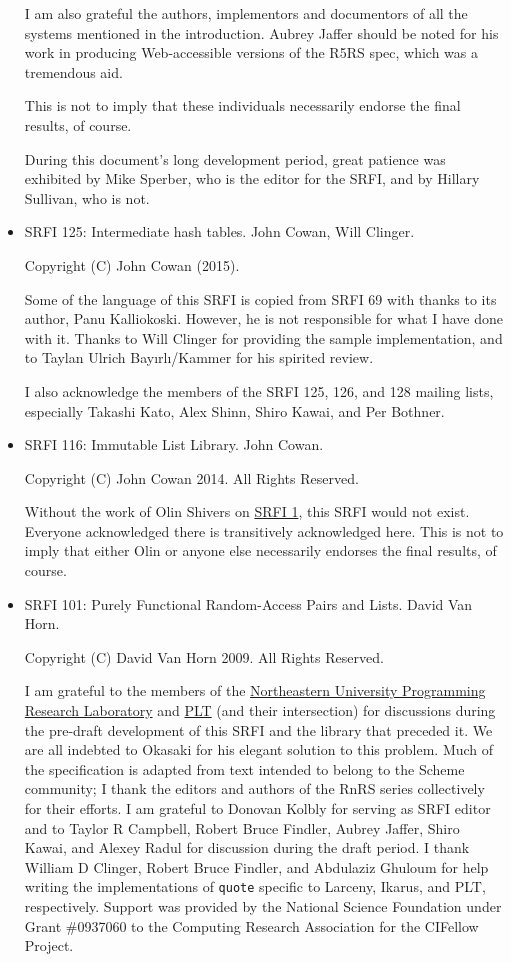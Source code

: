 \begin{itemize}
I am also grateful the authors, implementors and documentors of all the
systems mentioned in the introduction. Aubrey Jaffer should be noted for
his work in producing Web-accessible versions of the R5RS spec, which
was a tremendous aid.

This is not to imply that these individuals necessarily endorse the
final results, of course.

During this document's long development period, great patience was
exhibited by Mike Sperber, who is the editor for the SRFI, and by
Hillary Sullivan, who is not.

\item SRFI 125: Intermediate hash tables. John Cowan, Will Clinger.

Copyright (C) John Cowan (2015).

Some of the language of this SRFI is copied from SRFI 69 with thanks to
its author, Panu Kalliokoski. However, he is not responsible for what I
have done with it. Thanks to Will Clinger for providing the sample
implementation, and to Taylan Ulrich Bayırlı/Kammer for his spirited
review.

I also acknowledge the members of the SRFI 125, 126, and 128 mailing
lists, especially Takashi Kato, Alex Shinn, Shiro Kawai, and Per
Bothner.

\item SRFI 116: Immutable List Library. John Cowan.

Copyright (C) John Cowan 2014. All Rights Reserved.

Without the work of Olin Shivers on
\href{http://srfi.schemers.org/srfi-1/srfi-1.html}{SRFI 1}, this SRFI
would not exist. Everyone acknowledged there is transitively
acknowledged here. This is not to imply that either Olin or anyone else
necessarily endorses the final results, of course.

\item SRFI 101: Purely Functional Random-Access Pairs and Lists. David Van Horn.

Copyright (C) David Van Horn 2009. All Rights Reserved.

I am grateful to the members of the
\href{http://www.ccs.neu.edu/research/prl/}{Northeastern University
Programming Research Laboratory} and \href{http://plt-scheme.org/}{PLT}
(and their intersection) for discussions during the pre-draft
development of this SRFI and the library that preceded it. We are all
indebted to Okasaki for his elegant solution to this problem. Much of
the specification is adapted from text intended to belong to the Scheme
community; I thank the editors and authors of the RnRS series
collectively for their efforts. I am grateful to Donovan Kolbly for
serving as SRFI editor and to Taylor R Campbell, Robert Bruce Findler,
Aubrey Jaffer, Shiro Kawai, and Alexey Radul for discussion during the
draft period. I thank William D Clinger, Robert Bruce Findler, and
Abdulaziz Ghuloum for help writing the implementations of \texttt{quote}
specific to Larceny, Ikarus, and PLT, respectively. Support was provided
by the National Science Foundation under Grant \#0937060 to the
Computing Research Association for the CIFellow Project.


\end{itemize}
